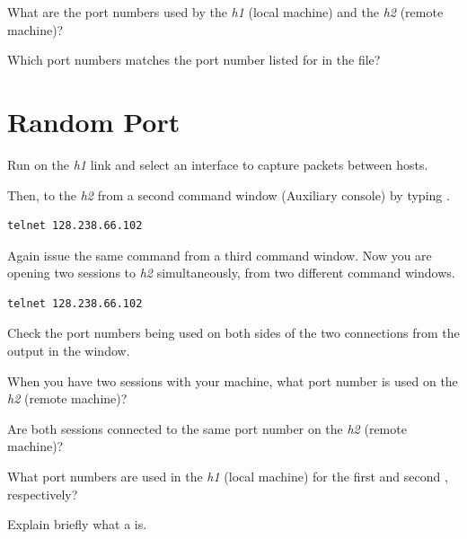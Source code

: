 \documentclass{../UTNetLab}
\begin{document}
\begin{report}
    \item What are the port numbers used by the \textit{h1} (local machine) and the \textit{h2} (remote machine)?

    \item Which port numbers matches the port number listed for  in the  file?
\end{report}

\section{Random Port}
Run  on the \textit{h1} link and select an interface to capture packets between hosts.

Then,  to the \textit{h2} from a second command window (Auxiliary console) by typing .

\begin{lstlisting}
telnet 128.238.66.102
\end{lstlisting}

Again issue the same  command from a third command window.
Now you are opening two  sessions to \textit{h2} simultaneously, from two different command windows.

\begin{lstlisting}
telnet 128.238.66.102
\end{lstlisting}

Check the port numbers being used on both sides of the two connections from the output in the  window.

\begin{report}
    \item When you have two  sessions with your machine, what port number is used on the \textit{h2} (remote machine)?

    \item Are both sessions connected to the same port number on the \textit{h2} (remote machine)?

    \item What port numbers are used in the \textit{h1} (local machine) for the first and second , respectively?

    \item Explain briefly what a  is.
\end{report}
\end{document}
